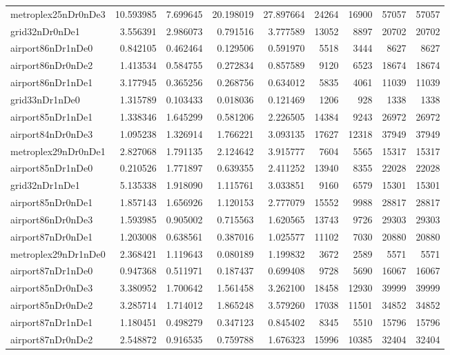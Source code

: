 \begin{longtable}{|l|r|r|r|r|r|r|r|r|}
metroplex25nDr0nDe3 & 10.593985 & 7.699645 & 20.198019 & 27.897664 & 24264 & 16900 & 57057 & 57057 \\
grid32nDr0nDe1 & 3.556391 & 2.986073 & 0.791516 & 3.777589 & 13052 & 8897 & 20702 & 20702 \\
airport86nDr1nDe0 & 0.842105 & 0.462464 & 0.129506 & 0.591970 & 5518 & 3444 & 8627 & 8627 \\
airport86nDr0nDe2 & 1.413534 & 0.584755 & 0.272834 & 0.857589 & 9120 & 6523 & 18674 & 18674 \\
airport86nDr1nDe1 & 3.177945 & 0.365256 & 0.268756 & 0.634012 & 5835 & 4061 & 11039 & 11039 \\
grid33nDr1nDe0 & 1.315789 & 0.103433 & 0.018036 & 0.121469 & 1206 & 928 & 1338 & 1338 \\
airport85nDr1nDe1 & 1.338346 & 1.645299 & 0.581206 & 2.226505 & 14384 & 9243 & 26972 & 26972 \\
airport84nDr0nDe3 & 1.095238 & 1.326914 & 1.766221 & 3.093135 & 17627 & 12318 & 37949 & 37949 \\
metroplex29nDr0nDe1 & 2.827068 & 1.791135 & 2.124642 & 3.915777 & 7604 & 5565 & 15317 & 15317 \\
airport85nDr1nDe0 & 0.210526 & 1.771897 & 0.639355 & 2.411252 & 13940 & 8355 & 22028 & 22028 \\
grid32nDr1nDe1 & 5.135338 & 1.918090 & 1.115761 & 3.033851 & 9160 & 6579 & 15301 & 15301 \\
airport85nDr0nDe1 & 1.857143 & 1.656926 & 1.120153 & 2.777079 & 15552 & 9988 & 28817 & 28817 \\
airport86nDr0nDe3 & 1.593985 & 0.905002 & 0.715563 & 1.620565 & 13743 & 9726 & 29303 & 29303 \\
airport87nDr0nDe1 & 1.203008 & 0.638561 & 0.387016 & 1.025577 & 11102 & 7030 & 20880 & 20880 \\
metroplex29nDr1nDe0 & 2.368421 & 1.119643 & 0.080189 & 1.199832 & 3672 & 2589 & 5571 & 5571 \\
airport87nDr1nDe0 & 0.947368 & 0.511971 & 0.187437 & 0.699408 & 9728 & 5690 & 16067 & 16067 \\
airport85nDr0nDe3 & 3.380952 & 1.700642 & 1.561458 & 3.262100 & 18458 & 12930 & 39999 & 39999 \\
airport85nDr0nDe2 & 3.285714 & 1.714012 & 1.865248 & 3.579260 & 17038 & 11501 & 34852 & 34852 \\
airport87nDr1nDe1 & 1.180451 & 0.498279 & 0.347123 & 0.845402 & 8345 & 5510 & 15796 & 15796 \\
airport87nDr0nDe2 & 2.548872 & 0.916535 & 0.759788 & 1.676323 & 15996 & 10385 & 32404 & 32404 \\

\end{longtable}
